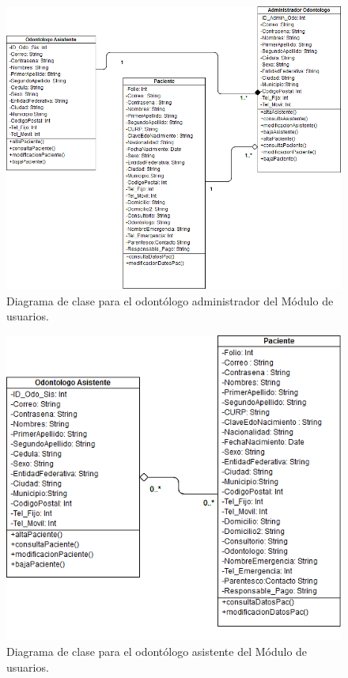 \begin{figure}[H]
\centering
\includegraphics[width=16cm,keepaspectratio]{pictures/DiagramaClases_AdminOdo_Prototipo1.png}
\caption{Diagrama de clase para el odontólogo administrador del Módulo de usuarios.}
\end{figure}

\begin{figure}[H]
\centering
\includegraphics[width=16cm,keepaspectratio]{pictures/DiagramaClases_OdoAsis_Prototitpo1.png}
\caption{Diagrama de clase para el odontólogo asistente del Módulo de usuarios.}
\end{figure}

